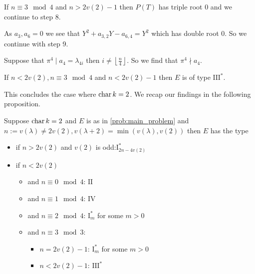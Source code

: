If  $n \equiv 3 \mod 4$ and $n > 2v(2) - 1$ then $P(T)$ has triple root $0$ and we continue to step 8.

As $a_3, a_6 = 0$ we see that $Y^2 + a_{3,2} Y - a_{6, 4} = Y^2 $ which has double root $0$. 
So we continue with step 9. 

Suppose that $ \pi^{4} \mid a_4 = \lambda_{4i}$ then $i \ne \left\lfloor \frac{n}{4} \right\rfloor$.
So we find that $\pi^{4} \nmid a_4$. 
\begin{tateconclusion}
	If $n < 2v(2), n\equiv 3 \mod 4$ and $n < 2v(2) - 1$ then $E$ is of type $\mathrm{III}^*$. 
\end{tateconclusion}

This concludes the case where $\operatorname{char} k = 2$. 
We recap our findings in the following proposition.

\begin{proposition}\label{prop:tate_char_is_2}
	Suppose $\operatorname{char} k = 2$ and $E$ is as in \cref{prob:main_problem} and $n:= v(\lambda) \ne 2v(2), v(\lambda + 2) = \min(v(\lambda), v(2))$
	then $E$ has the type
	\begin{itemize}
		\item if $n > 2v(2)$ and $v(2)$ is odd:$\mathrm I_{2n - 4v(2)}^*$
		\item if $n < 2v(2)$ 
			\begin{itemize}
				\item and $n \equiv 0 \mod 4$:  $\mathrm {II}$
				\item and  $n \equiv 1 \mod 4$:  $\mathrm {IV}$
				\item and $n \equiv 2 \mod 4$:  $\mathrm I^*_m$ for some $m > 0$
				\item and $n\equiv 3 \mod 3$: 
					\begin{itemize}
						\item $n = 2v(2) - 1$:  $\mathrm I_m^*$ for some $m > 0$ 
						\item $n < 2v(2) - 1$: $\mathrm {III}^*$
					\end{itemize}
			\end{itemize}
	\end{itemize}
\end{proposition}
